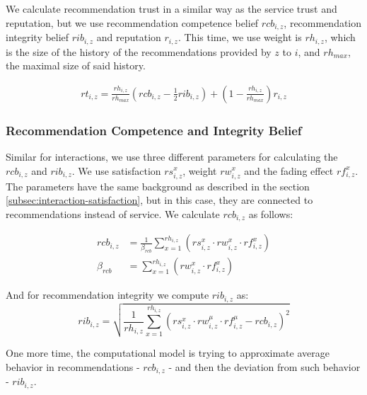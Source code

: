 We calculate recommendation trust in a similar way as the service trust and reputation, but we use recommendation competence belief $rcb_{i, z}$, recommendation integrity belief $rib_{i,z}$ and reputation $r_{i, z}$.
This time, we use weight is $rh_{i,z}$, which is the size of the history of the recommendations provided by $z$ to $i$, and $rh_{max}$, the maximal size of said history.

\begin{equation}
\label{eq:recommendation-trust}
\begin{split}
    rt_{i, z} = \frac{rh_{i,z}}{rh_{max}} \left(rcb_{i,z} - \frac{1}{2} rib_{i, z} \right) + \left(1 - \frac{rh_{i,z}}{rh_{max}} \right) r_{i,z}
\end{split}
\end{equation}

\subsubsection{Recommendation Competence and Integrity Belief}
\label{subsubsec:recommendation-competence-integrity-belief}
Similar for interactions, we use three different parameters for calculating the $rcb_{i, z}$ and $rib_{i,z}$. 
We use satisfaction $rs^{x}_{i, z}$, weight $rw^{x}_{i, z}$ and the fading effect $rf^{x}_{i, z}$. 
The parameters have the same background as described in the section \ref{subsec:interaction-satisfaction}, but in this case, they are connected to recommendations instead of service.
We calculate $rcb_{i, z}$ as follows:

\begin{equation}
\begin{split}
    rcb_{i, z} &= \frac{1}{\beta_{rcb}} \sum_{x = 1}^{rh_{i, z}}\left(rs_{i,z}^{x} \cdot rw_{i, z}^{x} \cdot rf_{i,z}^{x}\right) \\
    \beta_{rcb} &= \sum_{x = 1}^{rh_{i, z}}\left(rw_{i, z}^{x} \cdot rf_{i,z}^{x}\right)
\end{split}
\end{equation}

\noindent
And for recommendation integrity we compute $rib_{i, z}$ as:
\begin{equation}
    rib_{i, z} = \sqrt{\frac{1}{rh_{i, z}} \sum_{x=1}^{rh_{i,z}} \left(rs_{i,z}^{x} \cdot rw_{i, z}^{\mu} \cdot rf_{i,z}^{\mu} - rcb_{i,z}\right)^{2}}
\end{equation}

\noindent
One more time, the computational model is trying to approximate average behavior in recommendations - $rcb_{i,z}$ - and then the deviation from such behavior - $rib_{i,z}$.

